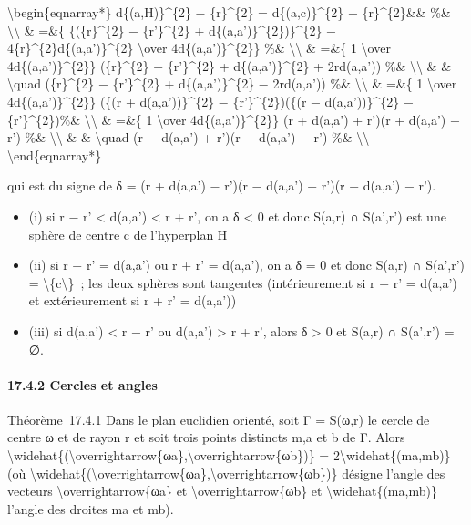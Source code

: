 \documentclass[]{article}
\begin{document}
\textbackslash{}begin\{eqnarray*\} d\{(a,H)\}\^{}\{2\} − \{r\}\^{}\{2\}
= d\{(a,c)\}\^{}\{2\} − \{r\}\^{}\{2\}\&\& \%\&
\textbackslash{}\textbackslash{} \& =\&\{ \{(\{r\}\^{}\{2\} −
\{r'\}\^{}\{2\} + d\{(a,a')\}\^{}\{2\})\}\^{}\{2\} −
4\{r\}\^{}\{2\}d\{(a,a')\}\^{}\{2\} \textbackslash{}over
4d\{(a,a')\}\^{}\{2\}\} \%\& \textbackslash{}\textbackslash{} \& =\&\{ 1
\textbackslash{}over 4d\{(a,a')\}\^{}\{2\}\} (\{r\}\^{}\{2\} −
\{r'\}\^{}\{2\} + d\{(a,a')\}\^{}\{2\} + 2rd(a,a')) \%\&
\textbackslash{}\textbackslash{} \& \& \textbackslash{}quad
(\{r\}\^{}\{2\} − \{r'\}\^{}\{2\} + d\{(a,a')\}\^{}\{2\} − 2rd(a,a'))
\%\& \textbackslash{}\textbackslash{} \& =\&\{ 1 \textbackslash{}over
4d\{(a,a')\}\^{}\{2\}\} (\{(r + d(a,a'))\}\^{}\{2\} −
\{r'\}\^{}\{2\})(\{(r − d(a,a'))\}\^{}\{2\} − \{r'\}\^{}\{2\})\%\&
\textbackslash{}\textbackslash{} \& =\&\{ 1 \textbackslash{}over
4d\{(a,a')\}\^{}\{2\}\} (r + d(a,a') + r')(r + d(a,a') − r') \%\&
\textbackslash{}\textbackslash{} \& \& \textbackslash{}quad (r − d(a,a')
+ r')(r − d(a,a') − r') \%\& \textbackslash{}\textbackslash{}
\textbackslash{}end\{eqnarray*\}

qui est du signe de δ = (r + d(a,a') − r')(r − d(a,a') + r')(r − d(a,a')
− r').

\begin{itemize}
\itemsep1pt\parskip0pt
\item
  (i) si \textbar{}r − r'\textbar{} \textless{} d(a,a') \textless{} r +
  r', on a δ \textless{} 0 et donc S(a,r) ∩ S(a',r') est une sphère de
  centre c de l'hyperplan H
\item
  (ii) si \textbar{}r − r'\textbar{} = d(a,a') ou r + r' = d(a,a'), on a
  δ = 0 et donc S(a,r) ∩ S(a',r') =
  \textbackslash{}\{c\textbackslash{}\}~; les deux sphères sont
  tangentes (intérieurement si \textbar{}r − r'\textbar{} = d(a,a') et
  extérieurement si r + r' = d(a,a'))
\item
  (iii) si d(a,a') \textless{} \textbar{}r − r'\textbar{} ou d(a,a')
  \textgreater{} r + r', alors δ \textgreater{} 0 et S(a,r) ∩ S(a',r') =
  ∅.
\end{itemize}

\paragraph{17.4.2 Cercles et angles}

Théorème~17.4.1 Dans le plan euclidien orienté, soit Γ = S(ω,r) le
cercle de centre ω et de rayon r et soit trois points distincts m,a et b
de Γ. Alors
\textbackslash{}widehat\{(\textbackslash{}overrightarrow\{ωa\},\textbackslash{}overrightarrow\{ωb\})\}
= 2\textbackslash{}widehat\{(ma,mb)\} (où
\textbackslash{}widehat\{(\textbackslash{}overrightarrow\{ωa\},\textbackslash{}overrightarrow\{ωb\})\}
désigne l'angle des vecteurs \textbackslash{}overrightarrow\{ωa\} et
\textbackslash{}overrightarrow\{ωb\} et
\textbackslash{}widehat\{(ma,mb)\} l'angle des droites ma et mb).
\end{document}
